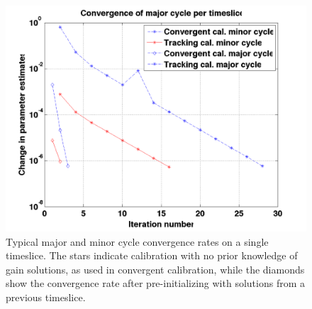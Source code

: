 \documentclass{aa}
\begin{document}




\begin{figure}[tbh]
\includegraphics[width=1\columnwidth]{Figs/major_minor_cycle_conv.png}

\caption{\label{fig:Convergence-behaviour-of}Typical   major  and   minor  cycle
  convergence rates on  a single timeslice. The stars  indicate calibration with
  no prior knowledge of gain solutions, as used in convergent calibration, while
  the diamonds  show the convergence rate after  pre-initializing with solutions
  from a previous timeslice.}
\end{figure}
\end{document}

